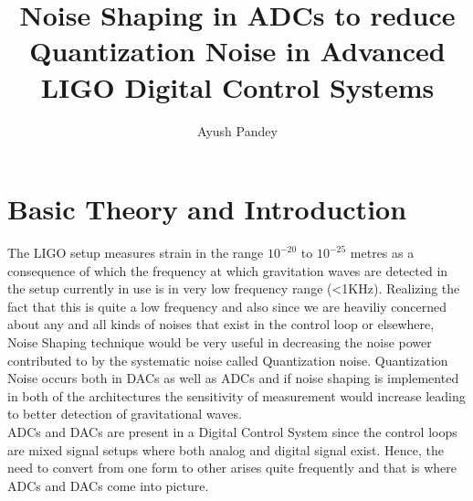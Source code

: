 \documentclass[colorlinks=true,pdfstartview=FitV,linkcolor=blue,
            citecolor=red,urlcolor=magenta]{ligodoc}
\title{Noise Shaping in ADCs to reduce Quantization Noise in Advanced LIGO Digital Control Systems}
\author{Ayush Pandey}
\begin{document}
\section{Basic Theory and Introduction}
 The LIGO setup measures strain in the range $10^{-20}$ to $10^{-25}$ metres as a consequence of which the frequency at which gravitation waves are detected in the setup currently in use is in  very low frequency range (<1KHz). Realizing the fact that this is quite a low frequency and also since we are heaviliy concerned about any and all kinds of noises that exist in the control loop or elsewhere, Noise Shaping technique would be very useful in decreasing the noise power contributed to by the systematic noise called Quantization noise. Quantization Noise occurs both in DACs as well as ADCs and if noise shaping is implemented in both of the architectures the sensitivity of measurement would increase leading to better detection of gravitational waves. \\
 ADCs and DACs are present in a Digital Control System since the control loops are mixed signal setups where both analog and digital signal exist. Hence, the need to convert from one form to other arises quite frequently and that is where ADCs and DACs come into picture. 
\end{document}
